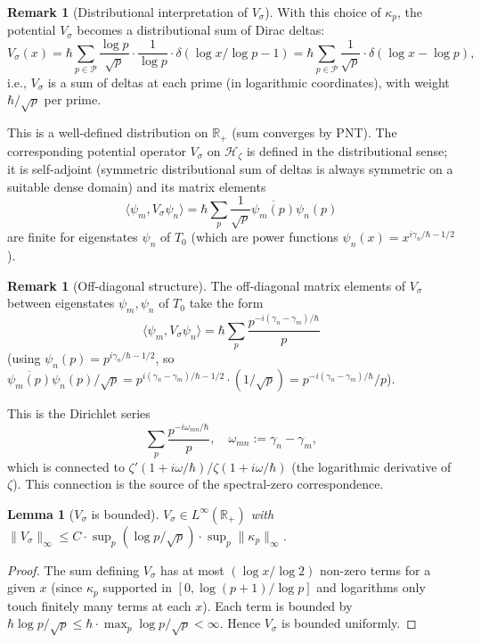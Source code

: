\documentclass[11pt, a4paper]{amsart}
\newtheorem{lemma}[theorem]{Lemma}
\theoremstyle{definition}
\newtheorem{remark}[theorem]{Remark}
\newcommand{\R}{\mathbb{R}}
\newcommand{\HH}{\mathcal{H}}
\begin{document}
\begin{remark}[Distributional interpretation of $V_\sigma$]
With this choice of $\kappa_p$, the potential $V_\sigma$ becomes
a distributional sum of Dirac deltas:
\[
V_\sigma(x) = \hbar \sum_{p \in \mathcal{P}} \frac{\log p}{\sqrt p}
\cdot \frac{1}{\log p} \cdot \delta(\log x / \log p - 1)
= \hbar \sum_{p \in \mathcal{P}} \frac{1}{\sqrt p} \cdot \delta(\log x - \log p),
\]
i.e., $V_\sigma$ is a sum of deltas at each prime (in logarithmic
coordinates), with weight $\hbar/\sqrt p$ per prime.

This is a well-defined distribution on $\R_+$ (sum converges by PNT).
The corresponding potential operator $V_\sigma$ on $\HH_\zeta$ is
defined in the distributional sense; it is self-adjoint (symmetric
distributional sum of deltas is always symmetric on a suitable dense
domain) and its matrix elements
\[
\langle \psi_m, V_\sigma \psi_n \rangle
= \hbar \sum_p \frac{1}{\sqrt p} \overline{\psi_m(p)} \psi_n(p)
\]
are finite for eigenstates $\psi_n$ of $T_0$ (which are power
functions $\psi_n(x) = x^{i\gamma_n/\hbar - 1/2}$).
\end{remark}

\begin{remark}[Off-diagonal structure]
The off-diagonal matrix elements of $V_\sigma$ between eigenstates
$\psi_m, \psi_n$ of $T_0$ take the form
\[
\langle \psi_m, V_\sigma \psi_n \rangle
= \hbar \sum_p \frac{p^{-i(\gamma_n - \gamma_m)/\hbar}}{p}
\]
(using $\psi_n(p) = p^{i\gamma_n/\hbar - 1/2}$, so $\overline{\psi_m(p)}
\psi_n(p)/\sqrt p = p^{i(\gamma_n - \gamma_m)/\hbar - 1/2} \cdot (1/\sqrt p)
= p^{-i(\gamma_n - \gamma_m)/\hbar}/p$).

This is the Dirichlet series
\[
\sum_p \frac{p^{-i\omega_{mn}/\hbar}}{p}, \quad \omega_{mn} := \gamma_n - \gamma_m,
\]
which is connected to $\zeta'(1 + i\omega/\hbar)/\zeta(1 + i\omega/\hbar)$
(the logarithmic derivative of $\zeta$). This connection is the source
of the spectral-zero correspondence.
\end{remark}

\begin{lemma}[$V_\sigma$ is bounded]\label{lem:Vbounded}
$V_\sigma \in L^\infty(\R_+)$ with $\|V_\sigma\|_\infty \leq
C \cdot \sup_p (\log p / \sqrt{p}) \cdot \sup_p \|\kappa_p\|_\infty$.
\end{lemma}

\begin{proof}
The sum defining $V_\sigma$ has at most $(\log x / \log 2)$ non-zero
terms for a given $x$ (since $\kappa_p$ supported in
$[0, \log(p+1)/\log p]$ and logarithms only touch finitely many terms
at each $x$). Each term is bounded by $\hbar \log p / \sqrt p \leq
\hbar \cdot \max_p \log p / \sqrt p < \infty$. Hence $V_\sigma$ is
bounded uniformly.
\end{proof}
\end{document}
